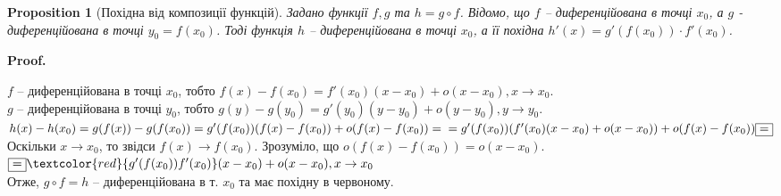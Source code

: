 \documentclass[a4paper, 14pt]{article}
\makeatletter
\def\qed{$\blacksquare$}
\theoremstyle{theoremdd}
\theoremstyle{theoremdd}
\theoremstyle{theoremdd}
\theoremstyle{theoremdd}
\theoremstyle{theoremdd}
\newtheorem{proposition}[theorem]{Proposition}
\theoremstyle{theoremdd}
\theoremstyle{theoremdd}
\theoremstyle{theoremdd}
\renewenvironment{proof}[1][Proof.\\]{\par
\pushQED{\hfill \qed}%
\normalfont \topsep6\p@\@plus6\p@\relax
\trivlist
\item\relax
{\bfseries
#1\@addpunct{.}}\hspace\labelsep\ignorespaces
}{%
\popQED\endtrivlist\@endpefalse
}
\makeatother
\begin{document}

\begin{proposition}[Похідна від композиції функцій]
Задано функції $f,g$ та $h=g \circ f$. Відомо, що $f$ -- диференційована в точці $x_0$, а $g$ - диференційована в точці $y_0 = f(x_0)$. Тоді функція $h$ -- диференційована в точці $x_0$, а її похідна $h'(x) = g'(f(x_0)) \cdot f'(x_0)$.
\end{proposition}

\begin{proof}
$f$ -- диференційована в точці $x_0$, тобто $f(x)-f(x_0)=f'(x_0)(x-x_0)+o(x-x_0), x \to x_0$.\\
$g$ -- диференційована в точці $y_0$, тобто $g(y)-g(y_0)=g'(y_0)(y-y_0)+o(y-y_0), y \to y_0$.\\
$h(x)-h(x_0) = g(f(x))-g(f(x_0)) = g'(f(x_0))(f(x)-f(x_0))+o(f(x)-f(x_0)) = \\
= g'(f(x_0))(f'(x_0)(x-x_0) + o(x-x_0)) + o(f(x)-f(x_0)) \boxed{=}$\\
Оскільки $x \to x_0$, то звідси $f(x) \to f(x_0)$. Зрозуміло, що $o(f(x)-f(x_0)) = o(x-x_0)$.\\
$\boxed{=} \textcolor{red}{g'(f(x_0))f'(x_0)}(x-x_0) + o(x-x_0), x \to x_0$\\
Отже, $g \circ f = h$ -- диференційована в т. $x_0$ та має похідну в червоному.
\end{proof}
\end{document}
